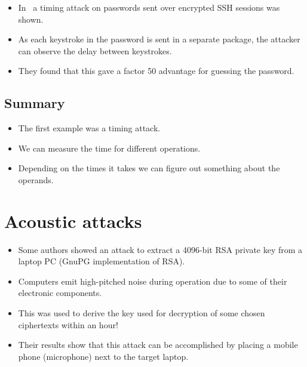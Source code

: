 \begin{frame}
  \begin{example}
    \begin{itemize}
      \item In~\cite{song2001timing} a timing attack on passwords sent over 
        encrypted SSH sessions was shown.

      \item As each keystroke in the password is sent in a separate package, 
        the attacker can observe the delay between keystrokes.

      \item They found that this gave a factor 50 advantage for guessing the 
        password.
    \end{itemize}
  \end{example}
\end{frame}

\subsection{Summary}

\begin{frame}
  \begin{itemize}
    \item The first example was a timing attack.
    \item We can measure the time for different operations.
    \item Depending on the times it takes we can figure out something about the 
      operands.
  \end{itemize}
\end{frame}


\section{Acoustic attacks}

\begin{frame}
  \begin{itemize}
    \item Some authors showed an attack to extract 
      a 4096-bit RSA private key from a laptop PC (GnuPG implementation of 
      RSA).

    \item Computers emit high-pitched noise during operation due to some of 
      their electronic components.

    \item This was used to derive the key used for decryption of some chosen 
      ciphertexts within an hour!

    \item Their results show that this attack can be accomplished by placing 
      a mobile phone (microphone) next to the target laptop.
  \end{itemize}
\end{frame}

